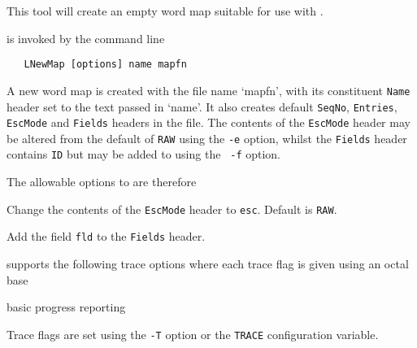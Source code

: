 %
%

\newpage
{}


This tool will create an empty word map suitable for use with
. 


 is invoked by the command line
\begin{verbatim}
   LNewMap [options] name mapfn
\end{verbatim}
A new word map is created with the file name `mapfn', with its
constituent {\tt Name} header set to the text passed in `name'.
It also creates default {\tt SeqNo}, {\tt Entries}, {\tt EscMode} and {\tt Fields}
headers in the file.  The contents of the {\tt EscMode} header may be
altered from the default of {\tt RAW} using the {\tt -e} option, whilst
the {\tt Fields} header contains {\tt ID} but may be added to using the {\tt
-f} option.

The allowable options to  are therefore
\begin{optlist}
   Change the contents of the {\tt EscMode} header to
      {\tt esc}. Default is {\tt RAW}.

   Add the field {\tt fld} to the {\tt Fields} header.

\end{optlist}


 supports the following trace options where each trace flag is 
given using an octal base
\begin{optlist}
    basic progress reporting
\end{optlist}
Trace flags are set using the \texttt{-T} option or the \texttt{TRACE}
configuration variable.
